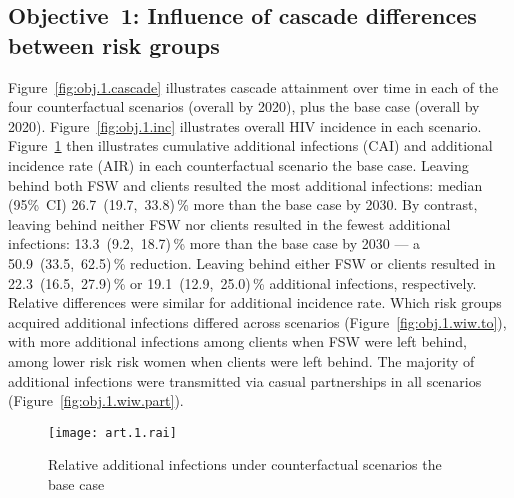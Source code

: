 \subsection{Objective~1: Influence of cascade differences between risk groups}\label{res.obj.1}
Figure~\ref{fig:obj.1.cascade} illustrates cascade attainment over time
in each of the four counterfactual scenarios (\casmd overall by 2020),
plus the base case (\cashi overall by 2020).
Figure~\ref{fig:obj.1.inc} illustrates overall HIV incidence in each scenario.
Figure~\ref{fig:obj.1.rai} then illustrates
cumulative additional infections (CAI) and additional incidence rate (AIR)
in each counterfactual scenario \vs the base case.
Leaving behind both FSW and clients resulted the most additional infections: median (95\%~CI)
26.7~(19.7,~33.8)\,\% more than the base case by 2030. %
By contrast, leaving behind neither FSW nor clients resulted in the fewest additional infections:
13.3~(9.2,~18.7)\,\% more than the base case by 2030 --- %
a 50.9~(33.5,~62.5)\,\% reduction. %
Leaving behind either FSW or clients resulted in
22.3~(16.5,~27.9)\,\% or 19.1~(12.9,~25.0)\,\% additional infections, respectively. %
Relative differences were similar for additional incidence rate.
Which risk groups acquired additional infections differed across scenarios
(Figure~\ref{fig:obj.1.wiw.to}),
with more additional infections among clients when FSW were left behind,
\vs among lower risk risk women when clients were left behind.
The majority of additional infections were transmitted
via casual partnerships in all scenarios (Figure~\ref{fig:obj.1.wiw.part}). %
\begin{figure}[h]
  \centering\texttt{[image: art.1.rai]}
  \caption{Relative additional infections under counterfactual scenarios \vs the base case}
  \label{fig:obj.1.rai}
\end{figure}

